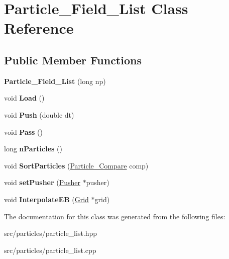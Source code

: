 \hypertarget{class_particle___field___list}{}\section{Particle\+\_\+\+Field\+\_\+\+List Class Reference}
\label{class_particle___field___list}
\subsection*{Public Member Functions}
\begin{DoxyCompactItemize}
\item 
\hypertarget{class_particle___field___list_adb8412593052a7c2d9d520f61a71925e}{}\label{class_particle___field___list_adb8412593052a7c2d9d520f61a71925e} 
{\bfseries Particle\+\_\+\+Field\+\_\+\+List} (long np)
\item 
\hypertarget{class_particle___field___list_ae36af53d8d7891eabba9dc35433a1fd9}{}\label{class_particle___field___list_ae36af53d8d7891eabba9dc35433a1fd9} 
void {\bfseries Load} ()
\item 
\hypertarget{class_particle___field___list_a3e3ae5d3305323ae815263bf8f8d92ad}{}\label{class_particle___field___list_a3e3ae5d3305323ae815263bf8f8d92ad} 
void {\bfseries Push} (double dt)
\item 
\hypertarget{class_particle___field___list_a147b292b835b8e39547858771e4c279a}{}\label{class_particle___field___list_a147b292b835b8e39547858771e4c279a} 
void {\bfseries Pass} ()
\item 
\hypertarget{class_particle___field___list_a0baa3beef71d9c0e026ba2f14b750529}{}\label{class_particle___field___list_a0baa3beef71d9c0e026ba2f14b750529} 
long {\bfseries n\+Particles} ()
\item 
\hypertarget{class_particle___field___list_a620fb6d347a8cc312d288550e63e3649}{}\label{class_particle___field___list_a620fb6d347a8cc312d288550e63e3649} 
void {\bfseries Sort\+Particles} (\hyperlink{class_particle___compare}{Particle\+\_\+\+Compare} comp)
\item 
\hypertarget{class_particle___field___list_aed3e3af8152eeb334ed57833aae9aa62}{}\label{class_particle___field___list_aed3e3af8152eeb334ed57833aae9aa62} 
void {\bfseries set\+Pusher} (\hyperlink{class_pusher}{Pusher} $\ast$pusher)
\item 
\hypertarget{class_particle___field___list_aae8c526251275504a6a6bdd753827551}{}\label{class_particle___field___list_aae8c526251275504a6a6bdd753827551} 
void {\bfseries Interpolate\+EB} (\hyperlink{class_grid}{Grid} $\ast$grid)
\end{DoxyCompactItemize}


The documentation for this class was generated from the following files\+:\begin{DoxyCompactItemize}
\item 
src/particles/particle\+\_\+list.\+hpp\item 
src/particles/particle\+\_\+list.\+cpp\end{DoxyCompactItemize}
